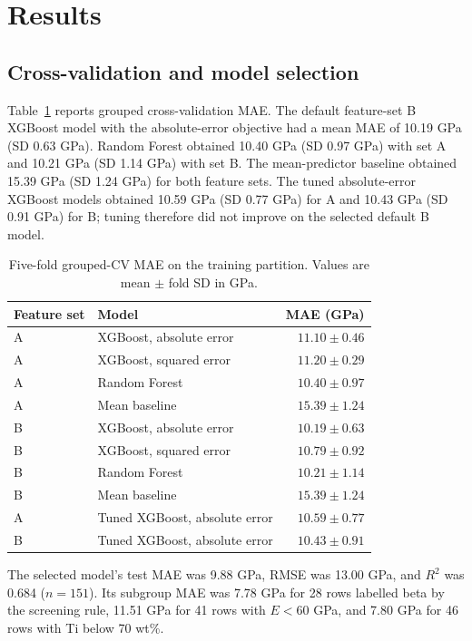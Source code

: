 \documentclass[11pt,oneside]{article}
\begin{document}
\section{Results}
\subsection{Cross-validation and model selection}
Table~\ref{tab:cv} reports grouped cross-validation MAE. The default feature-set B XGBoost model with the absolute-error objective had a mean MAE of 10.19 GPa (SD 0.63 GPa). Random Forest obtained 10.40 GPa (SD 0.97 GPa) with set A and 10.21 GPa (SD 1.14 GPa) with set B. The mean-predictor baseline obtained 15.39 GPa (SD 1.24 GPa) for both feature sets. The tuned absolute-error XGBoost models obtained 10.59 GPa (SD 0.77 GPa) for A and 10.43 GPa (SD 0.91 GPa) for B; tuning therefore did not improve on the selected default B model.

\begin{table}[H]
\centering
\caption{Five-fold grouped-CV MAE on the training partition. Values are mean \(\pm\) fold SD in GPa.}
\label{tab:cv}
\begin{tabular}{llr}
\toprule
Feature set & Model & MAE (GPa)\\
\midrule
A & XGBoost, absolute error & \(11.10 \pm 0.46\)\\
A & XGBoost, squared error & \(11.20 \pm 0.29\)\\
A & Random Forest & \(10.40 \pm 0.97\)\\
A & Mean baseline & \(15.39 \pm 1.24\)\\
B & XGBoost, absolute error & \(10.19 \pm 0.63\)\\
B & XGBoost, squared error & \(10.79 \pm 0.92\)\\
B & Random Forest & \(10.21 \pm 1.14\)\\
B & Mean baseline & \(15.39 \pm 1.24\)\\
A & Tuned XGBoost, absolute error & \(10.59 \pm 0.77\)\\
B & Tuned XGBoost, absolute error & \(10.43 \pm 0.91\)\\
\bottomrule
\end{tabular}
\end{table}

The selected model's test MAE was 9.88 GPa, RMSE was 13.00 GPa, and \(R^2\) was 0.684 (\(n=151\)). Its subgroup MAE was 7.78 GPa for 28 rows labelled beta by the screening rule, 11.51 GPa for 41 rows with \(E<60\) GPa, and 7.80 GPa for 46 rows with Ti below 70 wt\%.
\end{document}
